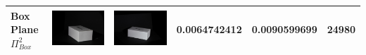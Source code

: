 \documentclass[final,12pt,3p]{elsarticle}
\begin{document}
\begin{table}[!ht]
{\begin{tabular}{| l | >{\centering\arraybackslash} m{2.5cm} | >{\centering\arraybackslash} m{2.5cm} | c | c | c |}
   Box Plane $\Pi_{Box}^{2}$ & \includegraphics[scale=0.05]{./images/box_cam1.JPG} & \includegraphics[scale=0.05]{./images/box_cam2.JPG} & 0.0064742412	& 0.0090599699 & 24980\\
   \hline

\end{tabular}}
\end{table}
\end{document}
